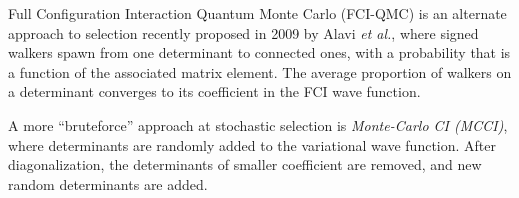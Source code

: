 \documentclass[./thesis.tex]{subfiles}
\begin{document}
Full Configuration Interaction Quantum Monte Carlo (FCI-QMC) is an alternate approach to selection recently proposed in 2009 by Alavi \textit{et al.},\cite{Booth_2009,Booth_2010,Cleland_2010} where signed walkers spawn from one determinant to connected ones, with a probability that is a function of the associated matrix element. The average proportion of walkers on a determinant converges to its coefficient in the FCI wave function.

A more ``bruteforce'' approach at stochastic selection is \emph{Monte-Carlo CI (MCCI)},\cite{Greer_1995,Greer_1998} where determinants are randomly added to the variational wave function. After diagonalization, the determinants of smaller coefficient are removed, and new random determinants are added.
\end{document}
